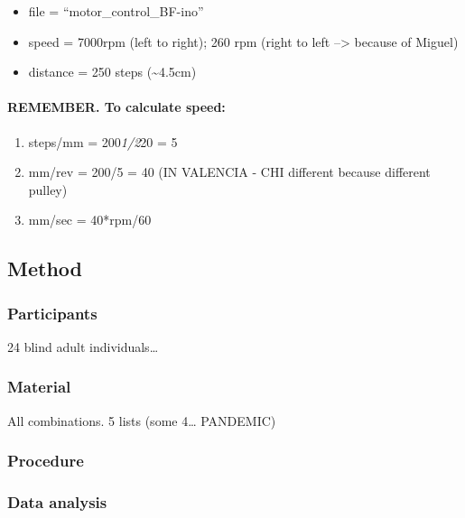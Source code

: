 \documentclass[english,man]{apa7}
\providecommand{\tightlist}{%
  \setlength{\itemsep}{0pt}\setlength{\parskip}{0pt}}
\begin{document}
\begin{itemize}
\tightlist
\item
  file = \enquote{motor\_control\_BF-ino}
\item
  speed = 7000rpm (left to right); 260 rpm (right to left --\textgreater{} because of Miguel)
\item
  distance = 250 steps (\textasciitilde{}4.5cm)
\end{itemize}

\hypertarget{remember.-to-calculate-speed}{%
\paragraph{REMEMBER. To calculate speed:}\label{remember.-to-calculate-speed}}

\begin{enumerate}
\def\labelenumi{\arabic{enumi}.}
\tightlist
\item
  steps/mm = 200\emph{1/2}20 = 5
\item
  mm/rev = 200/5 = 40 (IN VALENCIA - CHI different because different pulley)
\item
  mm/sec = 40*rpm/60
\end{enumerate}

\hypertarget{method-1}{%
\subsection{Method}\label{method-1}}

\hypertarget{participants-1}{%
\subsubsection{Participants}\label{participants-1}}

24 blind adult individuals\ldots{}

\hypertarget{material}{%
\subsubsection{Material}\label{material}}

All combinations. 5 lists (some 4\ldots{} PANDEMIC)

\hypertarget{procedure-1}{%
\subsubsection{Procedure}\label{procedure-1}}

\hypertarget{data-analysis-1}{%
\subsubsection{Data analysis}\label{data-analysis-1}}
\end{document}

